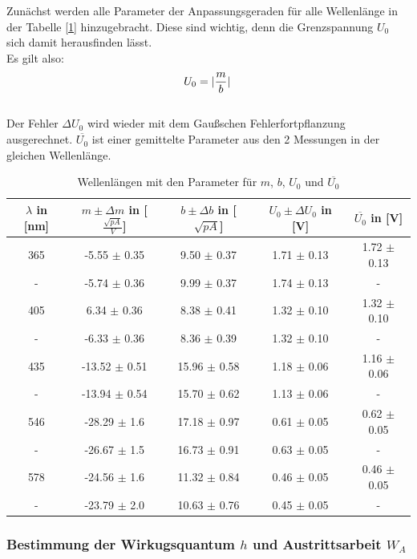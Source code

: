 \documentclass{article}
\begin{document}
Zunächst werden alle Parameter der Anpassungsgeraden für alle Wellenlänge in der Tabelle [\ref*{tab:wellenlaengen_trennstrich_m_b_U_gemittelt}]
hinzugebracht. Diese sind wichtig, denn die Grenzspannung $U_0$ sich damit herausfinden lässt. 
\\Es gilt also: 
\begin{equation}
  U_0 = \abs*{\frac{m}{b}}
\end{equation}
\\ Der Fehler $\Delta U_0$ wird wieder mit dem Gaußschen Fehlerfortpflanzung ausgerechnet. 
$\overline{U_0}$ ist einer gemittelte Parameter aus den 2 Messungen in der gleichen Wellenlänge.
\begin{table}[h!]
  \centering
  \begin{tabular}{|c|c|c|c|c|}
  \hline
  $\lambda$ in [nm] & $m \pm \Delta m$ in [$\frac{\sqrt{pA}}{V}$] & $b \pm \Delta b$ in [$\sqrt{pA}$] & $U_0 \pm \Delta U_0$ in [V] &  $\overline{U_0}$ in [V] \\ \hline
  365 & -5.55 $\pm$ 0.35 & 9.50 $\pm$ 0.37 & 1.71 $\pm$ 0.13 & 1.72 $\pm$ 0.13 \\ \hline
  - & -5.74 $\pm$ 0.36 & 9.99 $\pm$ 0.37 & 1.74 $\pm$ 0.13 & - \\ \hline
  405 & 6.34 $\pm$ 0.36 & 8.38 $\pm$ 0.41 & 1.32 $\pm$ 0.10 & 1.32 $\pm$ 0.10 \\ \hline
  - & -6.33 $\pm$ 0.36 & 8.36 $\pm$ 0.39 & 1.32 $\pm$ 0.10 & - \\ \hline
  435 & -13.52 $\pm$ 0.51 & 15.96 $\pm$ 0.58 & 1.18 $\pm$ 0.06 & 1.16 $\pm$ 0.06 \\ \hline
  - & -13.94 $\pm$ 0.54 & 15.70 $\pm$ 0.62 & 1.13 $\pm$ 0.06 & - \\ \hline
  546 & -28.29 $\pm$ 1.6 & 17.18 $\pm$ 0.97 & 0.61 $\pm$ 0.05 & 0.62 $\pm$ 0.05 \\ \hline
  - & -26.67 $\pm$ 1.5 & 16.73 $\pm$ 0.91 & 0.63 $\pm$ 0.05 & - \\ \hline
  578 & -24.56 $\pm$ 1.6 & 11.32 $\pm$ 0.84 & 0.46 $\pm$ 0.05 & 0.46 $\pm$ 0.05 \\ \hline
  - & -23.79 $\pm$ 2.0 & 10.63 $\pm$ 0.76 & 0.45 $\pm$ 0.05 & - \\ \hline
  \end{tabular}
  \caption{Wellenlängen mit den Parameter für $m$, $b$, $U_0$ und  $\overline{U_0}$}
  \label{tab:wellenlaengen_trennstrich_m_b_U_gemittelt}
\end{table}
\clearpage
\subsubsection*{Bestimmung der Wirkugsquantum $h$ und Austrittsarbeit $W_A$}
\end{document}
